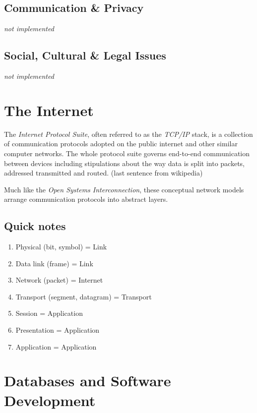 \documentclass[9pt]{article}
\let\oldsection\section
\renewcommand\section{\clearpage\oldsection}
\begin{document}
\subsection{Communication \& Privacy}
\label{sec:orgf9db26f}

\emph{not implemented}

\subsection{Social, Cultural \& Legal Issues}
\label{sec:orga087dac}

\emph{not implemented}

\section{The Internet}
\label{sec:org7ede653}


The \emph{Internet Protocol Suite}, often referred to as the \emph{TCP/IP} stack, is a collection of communication protocols adopted on the public internet and other similar computer networks. The whole protocol suite governs end-to-end communication between devices including stipulations about the way data is split into packets, addressed transmitted and routed. (last sentence from wikipedia)

Much like the \emph{Open Systems Interconnection}, these conceptual network models arrange communication protocols into abstract layers.

\subsection{Quick notes}
\label{sec:org77d27fc}

\begin{enumerate}
\item Physical (bit, symbol) = Link
\item Data link (frame) = Link
\item Network (packet) = Internet
\item Transport (segment, datagram) = Transport
\item Session = Application
\item Presentation = Application
\item Application = Application
\end{enumerate}

\section{Databases and Software Development}
\label{sec:org1ee9928}
\end{document}
